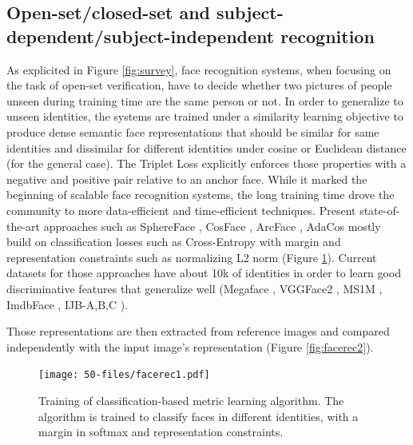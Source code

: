 \subsection{Open-set/closed-set and subject-dependent/subject-independent recognition}

As explicited in Figure \ref{fig:survey}, face recognition systems, when focusing on the task of open-set verification, have to decide whether two pictures of people unseen during training time are the same person or not. In order to generalize to unseen identities, the systems are trained under a similarity learning objective to produce dense semantic face representations that should be similar for same identities and dissimilar for different identities under cosine or Euclidean distance (for the general case). The Triplet Loss \cite{triplet,triplet-face} explicitly enforces those properties with a negative and positive pair relative to an anchor face. While it marked the beginning of scalable face recognition systems, the long training time drove the community to more data-efficient and time-efficient techniques. Present state-of-the-art approaches such as SphereFace \cite{sphereface}, CosFace \cite{cosface}, ArcFace \cite{arcface}, AdaCos \cite{adacos} mostly build on classification losses such as Cross-Entropy with margin and representation constraints such as normalizing L2 norm (Figure \ref{fig:facerec1}). Current datasets  for those approaches have about 10k of identities in order to learn good discriminative features that generalize well (Megaface \cite{megaface}, VGGFace2 \cite{vggface2}, MS1M \cite{celeb1m}, ImdbFace \cite{imdbface}, IJB-{A,B,C} \cite{ijb-a, ijb-b, ijb-c}).

Those representations are then extracted from reference images and compared independently with the input image’s representation (Figure \ref{fig:facerec2}).

\begin{figure}
    \centering
    \texttt{[image: 50-files/facerec1.pdf]}
    \caption{Training of classification-based metric learning algorithm. The algorithm is trained to classify faces in different identities, with a margin in softmax and representation constraints.}
    \label{fig:facerec1}
\end{figure}

